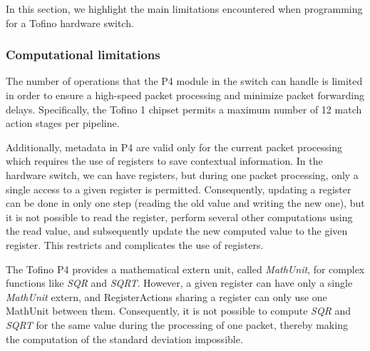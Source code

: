 In this section, we highlight the main limitations encountered when programming for a Tofino hardware switch.


\subsubsection{Computational limitations}

The number of operations that the P4 module in the switch can handle is limited in order to ensure a high-speed packet processing and minimize packet forwarding delays. Specifically, the Tofino 1 chipset permits a maximum number of 12 match action stages per pipeline.

Additionally, metadata in P4 are valid only for the current packet processing which requires the use of registers to save contextual information. In the hardware switch, we can have registers, but %
during one packet processing, only a single access to a given register is permitted. Consequently, updating a register can be done in only one step (reading the old value and writing the new one), but it is not possible to read the register, perform several other computations using the read value, and subsequently update the new computed value to the given register. This restricts and complicates the use of registers.

The Tofino P4 provides a mathematical extern unit, called \emph{MathUnit}, for complex functions like \emph{SQR} and \emph{SQRT}. However, a given register can  have only a single \emph{MathUnit} extern, and RegisterActions sharing a register can only use one MathUnit between them. Consequently, it is not possible to compute \emph{SQR} and \emph{SQRT} for the same value during the processing of one packet, thereby making the computation of the standard deviation impossible.  

